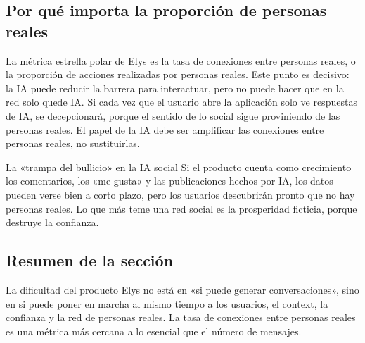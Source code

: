 \subsection{Por qué importa la proporción de personas reales}

La métrica estrella polar de Elys es la tasa de conexiones entre personas reales, o la proporción de acciones realizadas por personas reales. Este punto es decisivo: la IA puede reducir la barrera para interactuar, pero no puede hacer que en la red solo quede IA. Si cada vez que el usuario abre la aplicación solo ve respuestas de IA, se decepcionará, porque el sentido de lo social sigue proviniendo de las personas reales. El papel de la IA debe ser amplificar las conexiones entre personas reales, no sustituirlas.

\begin{warningbox}{La «trampa del bullicio» en la IA social}
Si el producto cuenta como crecimiento los comentarios, los «me gusta» y las publicaciones hechos por IA, los datos pueden verse bien a corto plazo, pero los usuarios descubrirán pronto que no hay personas reales. Lo que más teme una red social es la prosperidad ficticia, porque destruye la confianza.
\end{warningbox}

\subsection{Resumen de la sección}

La dificultad del producto Elys no está en «si puede generar conversaciones», sino en si puede poner en marcha al mismo tiempo a los usuarios, el context, la confianza y la red de personas reales. La tasa de conexiones entre personas reales es una métrica más cercana a lo esencial que el número de mensajes.
